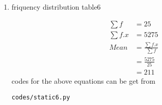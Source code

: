 \renewcommand{\theequation}{\theenumi}
\begin{enumerate}[label=\arabic*.,ref=\thesubsection.\theenumi]
\item\begin{table}[!ht]
	\centering
	
	\caption{friquency distribution table6 }
\end{table}
\begin{align}
\sum{f} &= 25
\\
\sum{f.x} &= 5275
\\
Mean &= \frac{\sum{f.x}}{\sum{f}}
\\ &= \frac{5275}{25}
\\&= 211
\end{align}
codes for the above equations can be get from
\begin{lstlisting}
codes/static6.py
\end{lstlisting}
\end{enumerate}